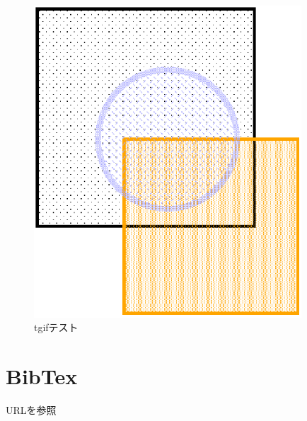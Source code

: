 \begin{figure}[t]
    \centering
    \includegraphics[width=10cm]{images/sample.eps}
    \caption{tgifテスト}
    \label{fig:tgif}
\end{figure}

\section{BibTex}
URL\cite{sagaweb}を参照